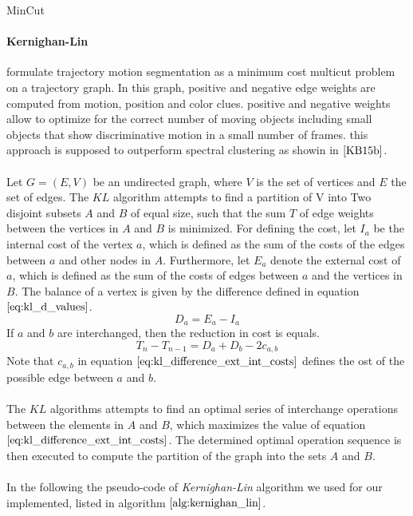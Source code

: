 MinCut
\paragraph{Kernighan-Lin} 
formulate trajectory motion segmentation as a minimum cost multicut problem on a trajectory graph. In this graph, positive and negative edge weights are computed from motion, position and color clues. positive and negative weights allow to optimize for the correct number of moving objects including small objects that show discriminative motion in a small number of frames. this approach is supposed to outperform spectral clustering as showin in $\cite{KB15b}$. \\ \\
Let $G = (E, V)$ be an undirected graph, where $V$ is the set of vertices and $E$ the set of edges. The $KL$ algorithm attempts to find a partition of V into Two disjoint subsets $A$ and $B$ of equal size, such that the sum $T$ of edge weights between the vertices in $A$ and $B$ is minimized. For defining the cost, let $I_a$ be the internal cost of the vertex $a$, which is defined as the sum of the costs of the edges between $a$ and other nodes in $A$. Furthermore, let $E_a$ denote the external cost of $a$, which is defined as the sum of the costs of edges between $a$ and the vertices in $B$. The balance of a vertex is given by the difference defined in equation $\ref{eq:kl_d_values}$.
\begin{equation}
	D_a = E_a - I_a
\label{eq:kl_d_values}
\end{equation}
If $a$ and $b$ are interchanged, then the reduction in cost is equals.
\begin{equation}
	T_{n} - T_{n-1} = D_a + D_b - 2c_{a,b}
\label{eq:kl_difference_ext_int_costs}
\end{equation}
Note that $c_{a,b}$ in equation $\ref{eq:kl_difference_ext_int_costs}$ defines the ost of the possible edge between $a$ and $b$. \\ \\
The $KL$ algorithms attempts to find an optimal series of interchange operations between the elements in $A$ and $B$, which maximizes the value of equation $\ref{eq:kl_difference_ext_int_costs}$. The determined optimal operation sequence is then executed to compute the partition of the graph into the sets $A$ and $B$. \\ \\
In the following the pseudo-code of \emph{Kernighan-Lin} algorithm we used for our implemented, listed in algorithm $\ref{alg:kernighan_lin}$.
